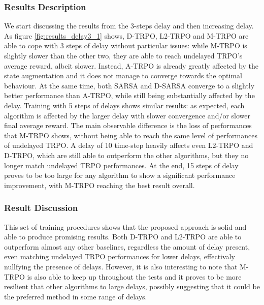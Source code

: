             \subsubsection{Results Description}
                We start discussing the results from the 3-steps delay and then increasing delay. As figure \ref{fig:results_delay3_1} shows, D-TRPO, L2-TRPO and M-TRPO are able to cope with 3 steps of delay without particular issues: while M-TRPO is slightly slower than the other two, they are able to reach undelayed TRPO's average reward, albeit slower. Instead, A-TRPO is already greatly affected by the state augmentation and it does not manage to converge towards the optimal behaviour. At the same time, both SARSA and D-SARSA converge to a slightly better performance than A-TRPO, while still being substantially affected by the delay.\newline
                Training with 5 steps of delays shows similar results: as expected, each algorithm is affected by the larger delay with slower convergence and/or slower final average reward. The main observable difference is the loss of performances that M-TRPO shows, without being able to reach the same level of performances of undelayed TRPO.\newline
                A delay of 10 time-step heavily affects even L2-TRPO and D-TRPO, which are still able to outperform the other algorithms, but they no longer match undelayed TRPO performances. At the end, 15 steps of delay proves to be too large for any algorithm to show a significant performance improvement, with M-TRPO reaching the best result overall.
            
            \subsubsection{Result Discussion}
                This set of training procedures shows that the proposed approach is solid and able to produce promising results. Both D-TRPO and L2-TRPO are able to outperform almost any other baselines, regardless the amount of delay present, even matching undelayed TRPO performances for lower delays, effectivaly nullfying the presence of delays. However, it is also interesting to note that M-TRPO is also able to keep up throughout the tests and it proves to be more resilient that other algorithms to large delays, possibly suggesting that it could be the preferred method in some range of delays. 
            
